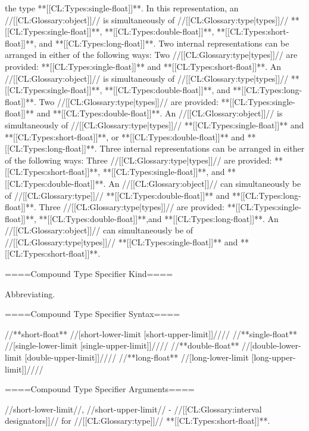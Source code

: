the type **[[CL:Types:single-float]]**. In this representation, an //[[CL:Glossary:object]]// is simultaneously of //[[CL:Glossary:type|types]]// **[[CL:Types:single-float]]**, **[[CL:Types:double-float]]**, **[[CL:Types:short-float]]**, and **[[CL:Types:long-float]]**. \itemitem{--} Two internal representations can be arranged in either of the following ways: \beginlist \itemitem{\bull} Two //[[CL:Glossary:type|types]]// are provided: **[[CL:Types:single-float]]** and **[[CL:Types:short-float]]**. An //[[CL:Glossary:object]]// is simultaneously of //[[CL:Glossary:type|types]]// **[[CL:Types:single-float]]**, **[[CL:Types:double-float]]**, and **[[CL:Types:long-float]]**. \itemitem{\bull} Two //[[CL:Glossary:type|types]]// are provided: **[[CL:Types:single-float]]** and **[[CL:Types:double-float]]**. An //[[CL:Glossary:object]]// is simultaneously of //[[CL:Glossary:type|types]]// **[[CL:Types:single-float]]** and **[[CL:Types:short-float]]**, or **[[CL:Types:double-float]]** and **[[CL:Types:long-float]]**. \endlist \itemitem{--} Three internal representations can be arranged in either of the following ways: \beginlist \itemitem{\bull} Three //[[CL:Glossary:type|types]]// are provided: **[[CL:Types:short-float]]**, **[[CL:Types:single-float]]**, and **[[CL:Types:double-float]]**. An //[[CL:Glossary:object]]// can simultaneously be of //[[CL:Glossary:type]]// **[[CL:Types:double-float]]** and **[[CL:Types:long-float]]**. \itemitem{\bull} Three //[[CL:Glossary:type|types]]// are provided: **[[CL:Types:single-float]]**, **[[CL:Types:double-float]]**,and **[[CL:Types:long-float]]**. An //[[CL:Glossary:object]]// can simultaneously be of //[[CL:Glossary:type|types]]// **[[CL:Types:single-float]]** and **[[CL:Types:short-float]]**. \endlist \endlist

====Compound Type Specifier Kind====

Abbreviating.

====Compound Type Specifier Syntax====

//**short-float** //[short-lower-limit [short-upper-limit]]//// //**single-float** //[single-lower-limit [single-upper-limit]]//// //**double-float** //[double-lower-limit [double-upper-limit]]//// //**long-float** //[long-lower-limit [long-upper-limit]]////

====Compound Type Specifier Arguments====

//short-lower-limit//, //short-upper-limit// - //[[CL:Glossary:interval designators]]// for //[[CL:Glossary:type]]// **[[CL:Types:short-float]]**. 

